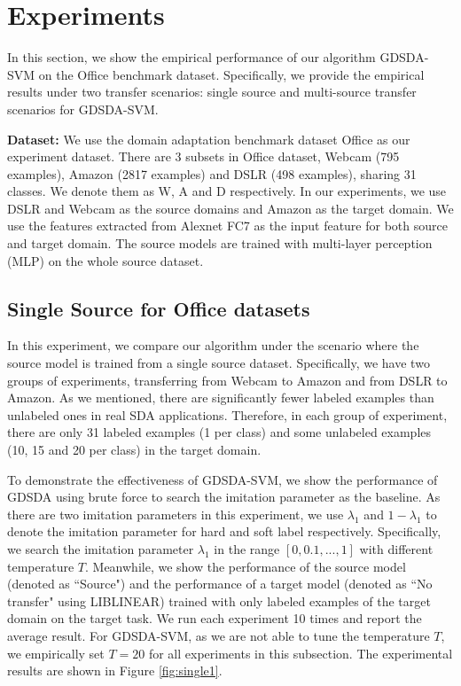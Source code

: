 \section{Experiments}\label{sec:aaai:exp}
In this section, we show the empirical performance of our algorithm GDSDA-SVM on the Office benchmark dataset. Specifically, we provide the empirical results under two transfer scenarios: single source and multi-source transfer scenarios for GDSDA-SVM.

\textbf{Dataset:}
We use the domain adaptation benchmark dataset Office as our experiment dataset. 
There are 3 subsets in Office dataset, Webcam (795 examples), Amazon (2817 examples) and DSLR (498 examples), sharing 31 classes. We denote them as W, A and D respectively. In our experiments, we use DSLR and Webcam as the source domains and Amazon as the target domain.
We use the features extracted from Alexnet \cite{krizhevsky2012imagenet} FC7 as the input feature for both source and target domain. The source models are trained with multi-layer perception (MLP) on the whole source dataset. 

\subsection{Single Source for Office datasets}
In this experiment, we compare our algorithm under the scenario where the source model is trained from a single source dataset. Specifically, we have two groups of experiments, transferring from Webcam to Amazon and from DSLR to Amazon. As we mentioned, there are significantly fewer labeled examples than unlabeled ones in real SDA applications.
Therefore, in each group of experiment, there are only 31 labeled examples (1 per class) and some unlabeled examples (10, 15 and 20 per class) in the target domain.

To demonstrate the effectiveness of GDSDA-SVM, we show the performance of GDSDA using brute force to search the imitation parameter as the baseline. As there are two imitation parameters in this experiment, we use $\lambda_1$ and  $1-\lambda_1$ to denote the imitation parameter for hard and soft label respectively. Specifically, we search the imitation parameter $\lambda_1$ in the range $[0,0.1,...,1]$ with different temperature $T$. Meanwhile, we show the performance of the source model (denoted as ``Source") and the performance of a target model (denoted as ``No transfer" using LIBLINEAR\cite{fan2008liblinear}) trained with only labeled examples of the target domain on the target task. We run each experiment 10 times and report the average result. For GDSDA-SVM, as we are not able to tune the temperature $T$, we empirically set $T=20$ for all experiments in this subsection. The experimental results are shown in Figure \ref{fig:single1}. 


